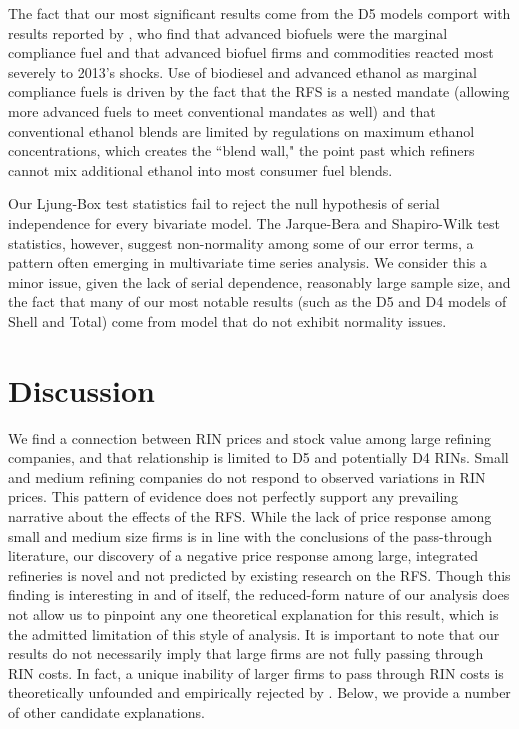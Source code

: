 \documentclass[11pt]{article}
\begin{document}
The fact that our most significant results come from the D5 models comport with results reported by \cite{Lade2018a}, who find that advanced biofuels were the marginal compliance fuel and that advanced biofuel firms and commodities reacted most severely to 2013's shocks. Use of biodiesel and advanced ethanol as marginal compliance fuels is driven by the fact that the RFS is a nested mandate (allowing more advanced fuels to meet conventional mandates as well) and that conventional ethanol blends are limited by regulations on maximum ethanol concentrations, which creates the ``blend wall," the point past which refiners cannot mix additional ethanol into most consumer fuel blends.

Our Ljung-Box test statistics fail to reject the null hypothesis of serial independence for every bivariate model. The Jarque-Bera and Shapiro-Wilk test statistics, however, suggest non-normality among some of our error terms, a pattern often emerging in multivariate time series analysis. We consider this a minor issue, given the lack of serial dependence, reasonably large sample size, and the fact that many of our most notable results (such as the D5 and D4 models of Shell and Total) come from model that do not exhibit normality issues.

\section{Discussion}

We find a connection between RIN prices and stock value among large refining companies, and that relationship is limited to D5 and potentially D4 RINs. Small and medium refining companies do not respond to observed variations in RIN prices. This pattern of evidence does not perfectly support any prevailing narrative about the effects of the RFS. While the lack of price response among small and medium size firms is in line with the conclusions of the pass-through literature, our discovery of a negative price response among large, integrated refineries is novel and not predicted by existing research on the RFS. Though this finding is interesting in and of itself, the reduced-form nature of our analysis does not allow us to pinpoint any one theoretical explanation for this result, which is the admitted limitation of this style of analysis. It is important to note that our results do not necessarily imply that large firms are not fully passing through RIN costs. In fact, a unique inability of larger firms to pass through RIN costs is theoretically unfounded and empirically rejected by \cite{Burkhardt2019}. Below, we provide a number of other candidate explanations.
\end{document}
